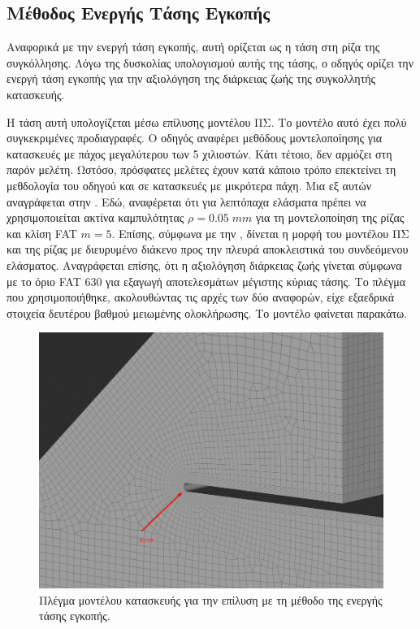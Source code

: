 \documentclass{article}
\begin{document}
\subsection{Μέθοδος Ενεργής Τάσης Εγκοπής}
Αναφορικά με την ενεργή τάση εγκοπής, αυτή ορίζεται ως η τάση στη ρίζα της συγκόλλησης. Λόγω της δυσκολίας υπολογισμού αυτής της τάσης, ο οδηγός ορίζει την ενεργή τάση εγκοπής για την αξιολόγηση της διάρκειας ζωής της συγκολλητής κατασκευής. 
\par Η τάση αυτή υπολογίζεται μέσω επίλυσης μοντέλου ΠΣ. Το μοντέλο αυτό έχει πολύ συγκεκριμένες προδιαγραφές. Ο οδηγός αναφέρει μεθόδους μοντελοποίησης για κατασκευές με πάχος μεγαλύτερου των 5 χιλιοστών. Κάτι τέτοιο, δεν αρμόζει στη παρόν μελέτη. Ωστόσο, πρόσφατες μελέτες έχουν κατά κάποιο τρόπο επεκτείνει τη μεθδολογία του οδηγού και σε κατασκευές με μικρότερα πάχη. Μια εξ αυτών αναγράφεται στην \cite{BAUMGARTNER2020105844}. Εδώ, αναφέρεται ότι για λεπτόπαχα ελάσματα πρέπει να χρησιμοποιείται ακτίνα καμπυλότητας $\rho = 0.05 \;mm$ για τη μοντελοποίηση της ρίζας και κλίση FAT $m=5$. Επίσης, σύμφωνα με την \cite{malik}, δίνεται η μορφή του μοντέλου ΠΣ και της ρίζας με διευρυμένο διάκενο προς την πλευρά αποκλειστικά του συνδεόμενου ελάσματος. Αναγράφεται επίσης, ότι η αξιολόγηση διάρκειας ζωής γίνεται σύμφωνα με το όριο FAT 630 για εξαγωγή αποτελεσμάτων μέγιστης κύριας τάσης. Το πλέγμα που χρησιμοποιήθηκε, ακολουθώντας τις αρχές των δύο αναφορών, είχε εξαεδρικά στοιχεία δευτέρου βαθμού μειωμένης ολοκλήρωσης. Το μοντέλο φαίνεται παρακάτω.
\begin{figure}[H]
    \centering
    \includegraphics[width = 0.45\linewidth]{media/gridef.png}
    \caption{Πλέγμα μοντέλου κατασκευής για την επίλυση με τη μέθοδο της ενεργής τάσης εγκοπής.}
    \label{fig:efgrid}
\end{figure}
\end{document}
